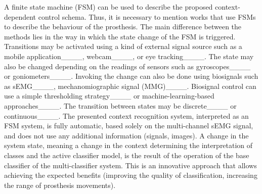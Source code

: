 A finite state machine (FSM) can be used to describe the proposed context-dependent control schema. Thus, it is necessary to mention works that use FSMs to describe the behaviour of the prosthesis. The main difference between the methods lies in the way in which the state change of the FSM is triggered. Transitions may be activated using a kind of external signal source such as a mobile application____, webcam____, or eye tracking____. The state may also be changed depending on the readings of sensors such as gyroscopes____ or goniometers____. Invoking the change can also be done using biosignals such as sEMG____, mechanomiographic signal (MMG)____. Biosignal control can use a simple thresholding strategy____ or machine-learning-based approaches____. The transition between states may be discrete____ or continuous____. The presented context recognition system, interpreted as an FSM system, is fully automatic, based solely on the multi-channel sEMG signal, and does not use any additional information (signals, images). A change in the system state, meaning a change in the context determining the interpretation of classes and the active classifier model, is the result of the operation of the base classifier of the multi-classifier system. This is an innovative approach that allows achieving the expected benefits (improving the quality of classification, increasing the range of prosthesis movements).